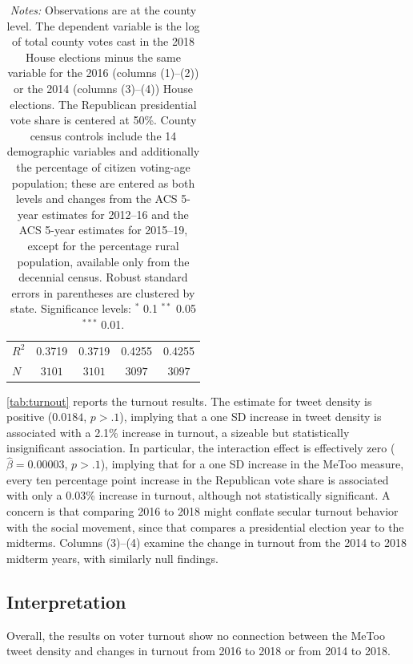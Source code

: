 \documentclass[manuscript,screen,nonacm,11pt,acm]{acmart}
\begin{document}
\begin{table}[tbp]
\begin{adjustbox}{max width=1\textwidth}
\begin{tabular}{@{\hspace{0\tabcolsep}}l*{4}{D{.}{.}{-1}}@{\hspace{0\tabcolsep}}}
$ R^2 $             &  0.3719         &  0.3719         &  0.4255         &  0.4255         \\
$ N $               &         &         &         &         \\
			\bottomrule
		\end{tabular}
	\end{adjustbox}
	\caption*{
		\footnotesize
		\emph{Notes:}
		Observations are at the county level.
		The dependent variable is the log of total county votes cast in the 2018 House elections minus the same variable for the 2016 (columns (1)--(2)) or the 2014 (columns (3)--(4)) House elections.
		The Republican presidential vote share is centered at 50\%.
		County census controls include the 14 demographic variables and additionally the percentage of citizen voting-age population; these are entered as both levels and changes from the ACS 5-year estimates for 2012--16 and the ACS 5-year estimates for 2015--19, except for the percentage rural population, available only from the decennial census.
		Robust standard errors in parentheses are clustered by state.
		Significance levels: $^*$ 0.1 $^{**}$ 0.05 $^{***}$ 0.01.
	}
\end{table}

\cref{tab:turnout} reports the turnout results.
The estimate for tweet density is positive ($0.0184$, $p > .1$), implying that a one SD increase in tweet density is associated with a 2.1\% increase in turnout, a sizeable but statistically insignificant association.
In particular, the interaction effect is effectively zero ($\hat{\beta}=0.00003$, $p > .1$), implying that for a one SD increase in the MeToo measure, every ten percentage point increase in the Republican vote share is associated with only a 0.03\% increase in turnout, although not statistically significant.
A concern is that comparing 2016 to 2018 might conflate secular turnout behavior with the social movement, since that compares a presidential election year to the midterms.
Columns (3)--(4) examine the change in turnout from the 2014 to 2018 midterm years, with similarly null findings.

\subsection{Interpretation}
\label{sec:turnout-discussion}
Overall, the results on voter turnout show no connection between the MeToo tweet density and changes in turnout from 2016 to 2018 or from 2014 to 2018.
\end{document}
